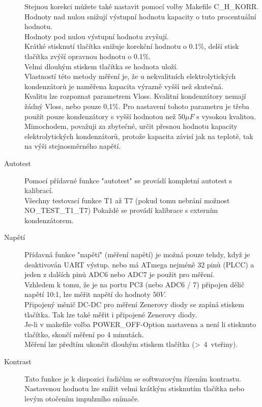 \begin{description}
Stejnou korekci můžete také nastavit pomocí volby Makefile C\_H\_KORR.
Hodnoty nad nulou snižují výstupní hodnotu kapacity o tuto procentuální hodnotu.\\ Hodnoty pod nulou výstupní hodnotu zvyšují.\\ Krátké stisknutí tlačítka snižuje korekční hodnotu o 0.1\%,
delší stisk tlačítka zvýší opravnou hodnotu o 0.1\%.\\ Velmi dlouhým stiskem tlačítka se hodnota uloží. \\Vlastností této metody měření je, že u nekvalitních elektrolytických kondenzátorů je naměřena kapacita výrazně vyšší než skutečná.\\
Kvalitu lze rozpoznat parametrem Vloss. Kvalitní kondenzátory nemají žádný Vloss, nebo pouze 0,1\%.
Pro nastavení tohoto parametru je třeba použít pouze kondenzátory s vyšší hodnotou než \(50\mu F\) s vysokou kvalitou.\\
Mimochodem, považuji za zbytečné, určit přesnou hodnotu kapacity elektrolytických kondenzátorů,
protože kapacita závisí jak na teplotě, tak na výši stejnosměrného napětí.
\vspace{-0.3cm}
 \item[Autotest]
Pomocí přídavné funkce "autotest" se provádí kompletní autotest s kalibrací.\\
Všechny testovací funkce T1 až T7 (pokud tomu nebrání možnost NO\_TEST\_T1\_T7)
Pokaždé se provádí kalibrace s externím kondenzátorem.
\vspace{-0.3cm}
 \item[Napětí]
Přídavná funkce "napětí" (měření napětí) je možná pouze tehdy, když je deaktivován UART výstup.
nebo má ATmega nejméně 32 pinů (PLCC) a jeden z dalších pinů  ADC6 nebo ADC7 je použit pro měření.
\\Vzhledem k tomu, že je na portu PC3 (nebo ADC6 / 7) připojen dělič napětí 10:1, lze měřit napětí do hodnoty \(50V\).\\
Připojený měnič DC-DC pro měření Zenerovy diody se zapíná stiskem tlačítka.
Tak lze také měřit i připojené Zenerovy diody.\\
Je-li v makefile volba POWER\_OFF-Option nastavena a není li stisknuto tlačítko, skončí měření
po 4 minutách.\\Měření lze předtím ukončit dlouhým stiskem tlačítka (\textgreater~4~vteřiny).
\vspace{-0.3cm}
\item[Kontrast] 
Tato funkce je k dispozici řadičům se softwarovým řízením kontrastu.
Nastavenou hodnotu lze snížit velmi krátkým stisknutím tlačítka nebo levým otočením impulzního snímače.

\end{description}
